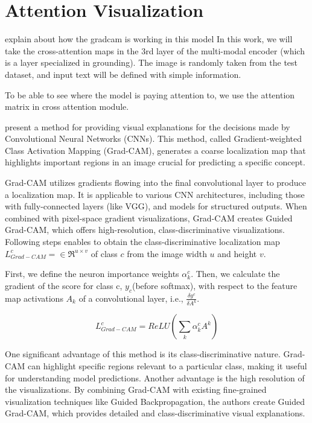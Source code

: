 

\section{Attention Visualization}

{\color{red} explain about how the gradcam is working in this model}
In this work, we will take the cross-attention maps in the 3rd layer of the multi-modal encoder (which is a layer specialized in grounding). The image is randomly taken from the test dataset, and input text will be defined with simple information.

To be able to see where the model is paying attention to, we use the attention matrix in cross attention module. 

\cite{gradcam} present a method for providing visual explanations for the decisions made by Convolutional Neural Networks (CNNs). This method, called Gradient-weighted Class Activation Mapping (Grad-CAM), generates a coarse localization map that highlights important regions in an image crucial for predicting a specific concept.

Grad-CAM utilizes gradients flowing into the final convolutional layer to produce a localization map. It is applicable to various CNN architectures, including those with fully-connected layers (like VGG), and models for structured outputs. When combined with pixel-space gradient visualizations, Grad-CAM creates Guided Grad-CAM, which offers high-resolution, class-discriminative visualizations.
Following steps enables to obtain the class-discriminative localization map $L^c_{Grad-CAM} = \in\Re^{u \times v}$ of class $c$ from the image width $u$ and height $v$. 

First, we define the neuron importance weights $\alpha^c_k$. Then, we calculate the gradient of the score for class c, $y_c$(before softmax), with respect to the feature map activations $A_k$ of a convolutional layer, i.e., $\frac{\delta y^c}{\delta A^k}$. 
 
\begin{displaymath}
    L^c_{Grad-CAM} = ReLU(\sum_k\alpha^c_kA^k)
\end{displaymath}

One significant advantage of this method is its class-discriminative nature. Grad-CAM can highlight specific regions relevant to a particular class, making it useful for understanding model predictions. Another advantage is the high resolution of the visualizations. By combining Grad-CAM with existing fine-grained visualization techniques like Guided Backpropagation, the authors create Guided Grad-CAM, which provides detailed and class-discriminative visual explanations.

